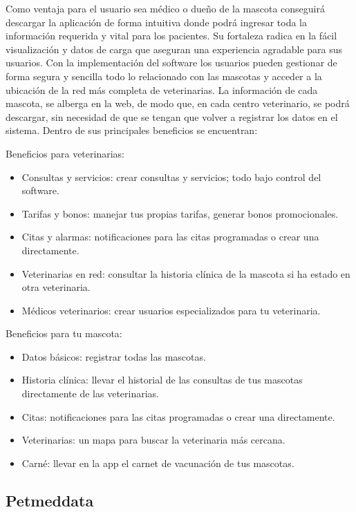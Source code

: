 Como ventaja para el usuario sea médico o dueño de la mascota conseguirá descargar la aplicación de forma intuitiva donde podrá ingresar toda la información requerida y vital para los pacientes. Su fortaleza radica en la fácil visualización y datos de carga que aseguran una experiencia agradable para sus usuarios. Con la implementación del software los usuarios pueden gestionar de forma segura y sencilla todo lo relacionado con las mascotas y acceder a la ubicación de la red más completa de veterinarias. La información de cada mascota, se alberga en la web, de modo que, en cada centro veterinario, se podrá descargar, sin necesidad de que se tengan que volver a registrar los datos en el sistema. Dentro de sus principales beneficios se encuentran:

Beneficios para veterinarias:
\begin{itemize}


\item	Consultas y servicios: crear consultas y servicios; todo bajo control del software.
\item	Tarifas y bonos: manejar tus propias tarifas, generar bonos promocionales.
\item	Citas y alarmas: notificaciones para las citas programadas o crear una directamente.
\item	Veterinarias en red: consultar la historia clínica de la mascota si ha estado en otra veterinaria.
\item	Médicos veterinarios: crear usuarios especializados para tu veterinaria.

\end{itemize}

Beneficios para tu mascota:
\begin{itemize}


\item	Datos básicos: registrar todas las mascotas.
\item	Historia clínica: llevar el historial de las consultas de tus mascotas directamente de las veterinarias.
\item	Citas: notificaciones para las citas programadas o crear una directamente.
\item	Veterinarias: un mapa para buscar la veterinaria más cercana.
\item	Carné: llevar en la app el carnet de vacunación de tus mascotas.
\end{itemize}


\subsection{Petmeddata}\label{chapter:introduction}



